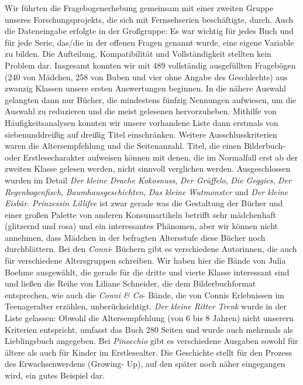 Wir führten die Fragebogenerhebung gemeinsam mit einer zweiten Gruppe
unseres Forschungsprojekts, die sich mit Fernsehserien beschäftigte,
durch. Auch die Dateneingabe erfolgte in der Großgruppe: Es war wichtig
für jedes Buch und für jede Serie, das/die in der offenen Fragen genannt
wurde, eine eigene Variable zu bilden. Die Aufteilung, Kompatibilität
und Vollständigkeit stellten kein Problem dar. Insgesamt konnten wir mit
489 vollständig ausgefüllten Fragebögen (240 von Mädchen, 258 von Buben
und vier ohne Angabe des Geschlechts) aus zwanzig Klassen unsere ersten
Auswertungen beginnen. In die nähere Auswahl gelangten dann nur Bücher,
die mindestens fünfzig Nennungen aufwiesen, um die Auswahl zu reduzieren
und die meist gelesenen hervorzuheben. Mithilfe von Häufigkeitsanalysen
konnten wir unsere vorhandene Liste dann erstmals von siebenunddreißig
auf dreißig Titel einschränken. Weitere Ausschlusskriterien waren die
Altersempfehlung und die Seitenanzahl. Titel, die einen Bilderbuch- oder
Erstlesecharakter aufweisen können mit denen, die im Normalfall erst ab
der zweiten Klasse gelesen werden, nicht sinnvoll verglichen werden.
Ausgeschlossen wurden im Detail \emph{Der kleine Drache Kokosnuss},
\emph{Der Grüffelo}, \emph{Die Geggies}, \emph{Der Regenbogenfisch},
\emph{Baumhausgeschichten}, \emph{Das kleine Wutmonster} und \emph{Der
kleine Eisbär}. \emph{Prinzessin Lillifee} ist zwar gerade was die
Gestaltung der Bücher und einer großen Palette von anderen
Konsumartikeln betrifft sehr mädchenhaft (glitzernd und rosa) und ein
interessantes Phänomen, aber wir können nicht annehmen, dass Mädchen in
der befragten Altersstufe diese Bücher noch durchblättern. Bei den
\emph{Conni}- Büchern gibt es verschiedene Autorinnen, die auch für
verschiedene Altersgruppen schreiben. Wir haben hier die Bände von Julia
Boehme ausgewählt, die gerade für die dritte und vierte Klasse
interessant sind und ließen die Reihe von Liliane Schneider, die dem
Bilderbuchformat entsprechen, wie auch die \emph{Conni \& Co}- Bände,
die von Connis Erlebnissen im Teenageralter erzählen, unberücksichtigt.
\emph{Der kleine Ritter Trenk} wurde in der Liste gelassen: Obwohl die
Altersempfehlung (von 6 bis 8 Jahren) nicht unserern Kriterien
entspricht, umfasst das Buch 280 Seiten und wurde auch mehrmals als
Lieblingsbuch angegeben. Bei \emph{Pinocchio} gibt es verschiedene
Ausgaben sowohl für ältere als auch für Kinder im Erstlesealter. Die
Geschichte stellt für den Prozess des Erwachsenwerdens (Growing- Up),
auf den später noch näher eingegangen wird, ein gutes Beispiel dar.

